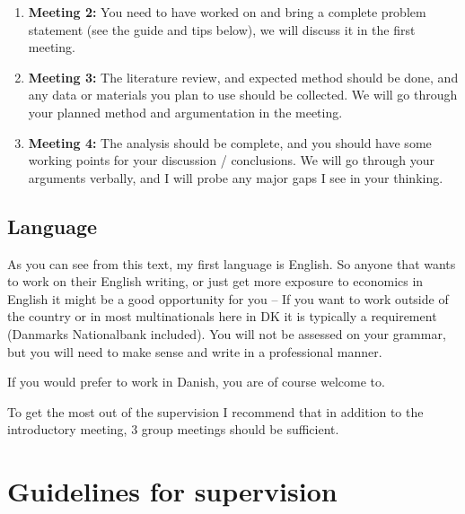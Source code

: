 \documentclass[
]{book}
\begin{document}
\begin{enumerate}
\def\labelenumi{\arabic{enumi}.}
\setcounter{enumi}{1}
\item
  \textbf{Meeting 2:} You need to have worked on and bring a complete
  problem statement (see the guide and tips below), we will discuss it in
  the first meeting.
\item
  \textbf{Meeting 3:} The literature review, and expected method should be
  done, and any data or materials you plan to use should be collected. We
  will go through your planned method and argumentation in the meeting.
\item
  \textbf{Meeting 4:} The analysis should be complete, and you should have
  some working points for your discussion / conclusions. We will go
  through your arguments verbally, and I will probe any major gaps I see
  in your thinking.
\end{enumerate}

\hypertarget{language}{%
\section{Language}\label{language}}

As you can see from this text, my first language is English. So anyone
that wants to work on their English writing, or just get more exposure
to economics in English it might be a good opportunity for you -- If you
want to work outside of the country or in most multinationals here in DK
it is typically a requirement (Danmarks Nationalbank included). You will
not be assessed on your grammar, but you will need to make sense and
write in a professional manner.

If you would prefer to work in Danish, you are of course welcome to.

To get the most out of the supervision I recommend that in addition to
the introductory meeting, 3 group meetings should be sufficient.

\hypertarget{guidelines-for-supervision}{%
\chapter{Guidelines for supervision}\label{guidelines-for-supervision}}
\end{document}
